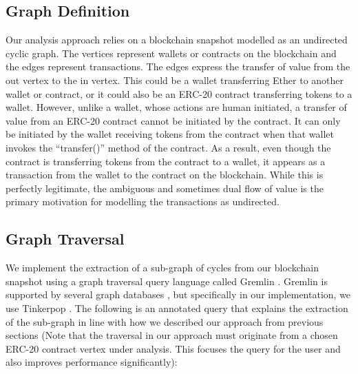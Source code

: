\documentclass[conference]{IEEEtran}
\begin{document}
\subsection{Graph Definition}\label{graphdefinition}
Our analysis approach relies on a blockchain snapshot modelled as an undirected cyclic graph. The vertices represent wallets or contracts on the blockchain and the edges represent transactions.  The edges express the transfer of value from the out vertex to the in vertex.  This could be a wallet transferring Ether to another wallet or contract,  or it could also be an ERC-20 contract transferring tokens to a wallet. However, unlike a wallet, whose actions are human initiated, a transfer of value from an ERC-20 contract cannot be initiated by the contract.  It can only be initiated by the wallet receiving tokens from the contract when that wallet invokes the ``transfer()'' method of the contract. As a result, even though the contract is transferring tokens from the contract to a wallet,  it appears as a transaction from the wallet to the contract on the blockchain. While this is perfectly legitimate, the ambiguous and sometimes dual flow of value is the primary motivation for modelling the transactions as undirected.  

\subsection{Graph Traversal}\label{graphtraversal}
We implement the extraction of a sub-graph of cycles from our blockchain snapshot using a graph traversal query language called Gremlin \cite{rodriguez2015gremlin}.  Gremlin is supported by several graph databases \cite{holzschuher2013performance}, but specifically in our implementation, we use Tinkerpop \cite{jouili2013empirical}.  The following is an annotated query that explains the extraction of the sub-graph in line with how we described our approach from previous sections (Note that the traversal in our approach must originate from a chosen ERC-20 contract vertex under analysis.  This focuses the query for the user and also improves performance significantly):
\end{document}
